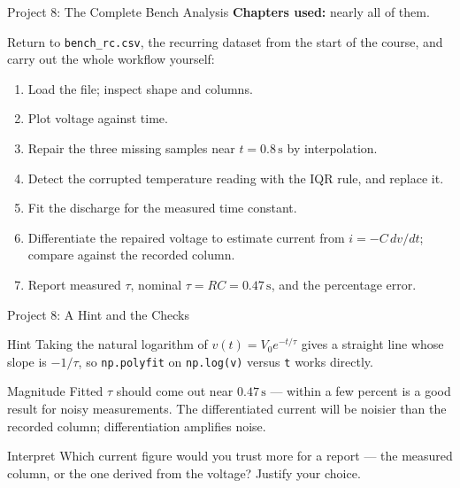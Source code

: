 \documentclass[9pt,aspectratio=169,xcolor=table]{beamer}
\begin{document}
\begin{frame}{Project 8: The Complete Bench Analysis}
    \leavevmode
    \textbf{Chapters used:} nearly all of them.

    \vspace{2mm}
    Return to \texttt{bench\_rc.csv}, the recurring dataset from the
    start of the course, and carry out the whole workflow yourself:

    \vspace{1mm}
    \begin{enumerate}\itemsep1pt
        \item Load the file; inspect shape and columns.
        \item Plot voltage against time.
        \item Repair the three missing samples near $t = 0.8\,\text{s}$
              by interpolation.
        \item Detect the corrupted temperature reading with the IQR
              rule, and replace it.
        \item Fit the discharge for the measured time constant.
        \item Differentiate the repaired voltage to estimate current
              from $i = -C\,dv/dt$; compare against the recorded column.
        \item Report measured $\tau$, nominal $\tau = RC = 0.47\,\text{s}$,
              and the percentage error.
    \end{enumerate}
\end{frame}

\begin{frame}{Project 8: A Hint and the Checks}
    \leavevmode
    \begin{block}{Hint}
        Taking the natural logarithm of $v(t) = V_0 e^{-t/\tau}$ gives a
        straight line whose slope is $-1/\tau$, so \texttt{np.polyfit}
        on \texttt{np.log(v)} versus \texttt{t} works directly.
    \end{block}

    \vspace{2mm}
    \begin{block}{Magnitude}
        Fitted $\tau$ should come out near $0.47\,\text{s}$ --- within a
        few percent is a good result for noisy measurements. The
        differentiated current will be noisier than the recorded
        column; differentiation amplifies noise.
    \end{block}

    \vspace{2mm}
    \begin{alertblock}{Interpret}
        Which current figure would you trust more for a report --- the
        measured column, or the one derived from the voltage? Justify
        your choice.
    \end{alertblock}
\end{frame}
\end{document}
